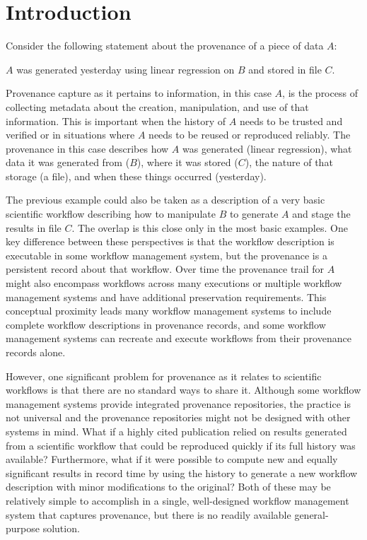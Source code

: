 \section{Introduction}
Consider the following statement about the provenance of a piece of data $A$:
\begin{displayquote}
    $A$ was generated yesterday using linear regression on $B$ and stored in
    file $C$.
\end{displayquote}
Provenance capture as it pertains to information, in this case $A$, is the
process of collecting metadata about the creation, manipulation, and use of that
information. This is important when the history of $A$ needs to be trusted and
verified or in situations where $A$ needs to be reused or reproduced reliably.
The provenance in this case describes how $A$ was generated (linear regression),
what data it was generated from ($B$), where it was stored ($C$), the nature of
that storage (a file), and when these things occurred (yesterday).

The previous example could also be taken as a description of a very basic
scientific workflow describing how to manipulate $B$ to generate $A$ and stage
the results in file $C$. The overlap is this close only in the most basic
examples. One key difference between these perspectives is that the workflow
description is executable in some workflow management system, but the provenance
is a persistent record about that workflow. Over time the provenance trail for
$A$ might also encompass workflows across many executions or multiple workflow
management systems and have additional preservation requirements. This
conceptual proximity leads many workflow management systems to include complete
workflow descriptions in provenance records, and some workflow management
systems can recreate and execute workflows from their provenance records alone.

However, one significant problem for provenance as it relates to scientific
workflows is that there are no standard ways to share it. Although some workflow
management systems provide integrated provenance repositories, the practice is
not universal and the provenance repositories might not be designed with other
systems in mind. What if a highly cited publication relied on results generated
from a scientific workflow that could be reproduced quickly if its full history
was available? Furthermore, what if it were possible to compute new and equally
significant results in record time by using the history to generate a new
workflow description with minor modifications to the original? Both of these may
be relatively simple to accomplish in a single, well-designed workflow
management system that captures provenance, but there is no readily available
general-purpose solution.

